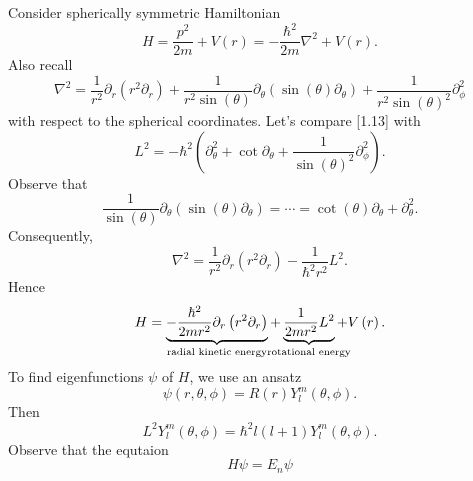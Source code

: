 \documentclass[phys334]{subfiles}
\begin{document}
    \np Consider spherically symmetric Hamiltonian
    \begin{equation*}
        H = \frac{p^{2}}{2m} + V\left( r \right) = -\frac{\hbar^{2}}{2m}\nabla^{2}+V\left( r \right).
    \end{equation*}
    Also recall
    \begin{equation}
        \nabla^{2} = \frac{1}{r^{2}} \partial_r \left( r^{2}\partial_r \right) + \frac{1}{r^{2}\sin\left( \theta \right)} \partial_{\theta}\left( \sin\left( \theta \right)\partial_{\theta} \right) + \frac{1}{r^{2}\sin\left( \theta \right)^{2}} \partial_{\phi}^{2}
    \end{equation} 
    with respect to the spherical coordinates. Let's compare [1.13] with
    \begin{equation*}
        L^{2} = -\hbar^{2}\left( \partial_{\theta}^{2}+\cot\partial_{\theta}+\frac{1}{\sin\left( \theta \right)^{2}}\partial_{\phi}^{2} \right).
    \end{equation*}
    Observe that
    \begin{equation*}
        \frac{1}{\sin\left( \theta \right)}\partial_{\theta}\left(\sin\left( \theta \right)\partial_{\theta}\right) = \cdots = \cot\left( \theta \right) \partial_{\theta} + \partial_{\theta}^{2}.
    \end{equation*}
    Consequently,
    \begin{equation*}
        \nabla^{2} = \frac{1}{r^{2}}\partial_r\left( r^{2}\partial_r \right) - \frac{1}{\hbar^{2}r^{2}}L^{2}.
    \end{equation*}
    Hence
    \begin{equation*}
        H = \underbrace{-\frac{\hbar^{2}}{2mr^{2}}\partial_r\left( r^{2}\partial_r \right)}_{\text{radial kinetic energy}} + \underbrace{\frac{1}{2mr^{2}}L^{2}}_{\clap{\text{\scriptsize rotational energy}}} + V\left( r \right).
    \end{equation*}
    To find eigenfunctions $\psi$ of $H$, we use an ansatz
    \begin{equation*}
        \psi\left( r,\theta,\phi \right) = R\left( r \right)Y_l^m\left( \theta,\phi \right).
    \end{equation*}
    Then
    \begin{equation*}
        L^{2}Y_l^m\left( \theta,\phi \right) = \hbar^{2}l\left( l+1 \right)Y_l^m\left( \theta,\phi \right).
    \end{equation*}
    Observe that the equtaion
    \begin{equation*}
        H\psi = E_n\psi
    \end{equation*}
\end{document}
